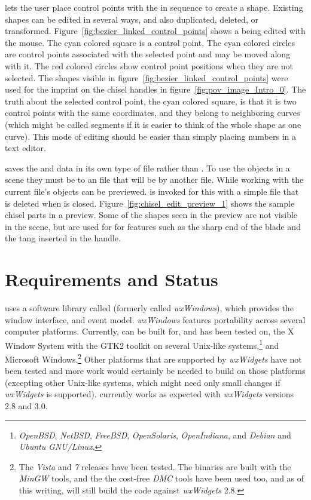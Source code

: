 \IXpkgu{} lets the user place control points with the
 in sequence to create a shape.
Existing shapes can be edited in several ways, and also
duplicated, deleted, or transformed.
Figure~\ref{fig:bezier_linked_control_points}
shows a \IXarg{\dtybezil} \IXspline{} being edited with the mouse.
The cyan colored square is a  control
point. The cyan colored circles are control points
associated with the selected point and may be moved along with
it. The red colored circles show control point
positions when they are not selected. The shapes visible
in figure~\ref{fig:bezier_linked_control_points} were
used for the imprint on the chisel handles in
figure~\ref{fig:pov_image_Intro_0}. The truth about
the selected control point, the cyan colored square, is
that it is two control points with the same coordinates,
and they belong to neighboring curves (which might be
called segments if it is easier to think of the whole
shape as one curve). This mode of editing should be easier
than simply placing numbers in a text editor.

\IXpkgu{} saves the \IXprism{} and \IXlathe{} data in its own type
of file rather than \IXpov{} .
To use the objects in a \IXpov{} scene they
must be  to an  file that will be
 by another  file. While
working with \IXpkg{} the current file's objects can
be previewed. \IXpov{} is invoked for this with a simple
 file that is deleted when \IXpov{} is closed.
Figure~\ref{fig:chisel_edit_preview_1}
shows the sample chisel parts in a \IXpov{} preview. Some
of the shapes seen in the preview are not visible in
the scene, but are used for
 for features
such as the sharp end of the blade and the tang inserted
in the handle.


\section{Requirements and Status}%
	\label{sec:requirement_status}

\IXpkgu{} uses a software library called 
(formerly called \emph{wxWindows}), which provides the window
interface, and event model. \emph{wxWindows} features
portability across several computer platforms. Currently,
\IXpkg{} can be built for, and has been tested on, the
X Window System with the GTK2 toolkit on several
Unix-like systems,\footnote{
\emph{OpenBSD}, \emph{NetBSD}, \emph{FreeBSD},
\emph{OpenSolaris}, \emph{OpenIndiana}, and
\emph{Debian} and \emph{Ubuntu} \emph{GNU/Linux}.
}
and Microsoft Windows.\footnote{
The \emph{Vista} and \emph{7} releases have been tested.
The binaries are built with the \emph{MinGW} tools, and
the the cost-free \emph{DMC} tools have been used too,
and as of this writing, will still build the code against
\emph{wxWidgets} 2.8.
}
Other platforms that are supported by \emph{wxWidgets} have
not been tested and
more work would certainly be needed to
build \IXpkg{} on those platforms
(excepting other Unix-like systems, which might
need only small changes if \emph{wxWidgets} is supported).
\IXpkgu{} currently works as expected with
\emph{wxWidgets} versions 2.8 and 3.0.

